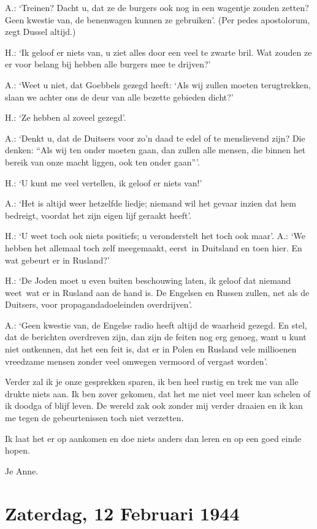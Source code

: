 \documentclass{book}
\begin{document}
A.: `Treinen? Dacht u, dat ze de burgers ook nog in een wagentje zouden
zetten? Geen kwestie van, de benenwagen kunnen ze gebruiken'. (Per pedes
apostolorum, zegt Dussel altijd.)

H.: `Ik geloof er niets van, u ziet alles door een veel te zwarte bril.
Wat zouden ze er voor belang bij hebben alle burgers mee te drijven?'

A.: `Weet u niet, dat Goebbels gezegd heeft: `Als wij zullen moeten
terugtrekken, slaan we achter ons de deur van alle bezette gebieden
dicht?'

H.: `Ze hebben al zoveel gezegd'.

A.: `Denkt u, dat de Duitsers voor zo'n daad te edel of te menslievend
zijn? Die denken: ``Als wij ten onder moeten gaan, dan zullen alle
mensen, die binnen het bereik van onze macht liggen, ook ten onder
gaan'''.

H.: `U kunt me veel vertellen, ik geloof er niets van!'

A.: `Het is altijd weer hetzelfde liedje; niemand wil het gevaar inzien
dat hem bedreigt, voordat het zijn eigen lijf geraakt heeft'.

H.: `U weet toch ook niets positiefs; u veronderstelt het toch ook
maar'. A.: `We hebben het allemaal toch zelf meegemaakt, eerst~in
Duitsland en toen hier. En wat gebeurt er in Rusland?'

H.: `De Joden moet u even buiten beschouwing laten, ik geloof dat
niemand weet~wat er in Rusland aan de hand is. De Engelsen en Russen
zullen, net als de Duitsers, voor propagandadoeleinden overdrijven'.

A.: `Geen kwestie van, de Engelse radio heeft altijd de waarheid gezegd.
En stel, dat de berichten overdreven zijn, dan zijn de feiten nog erg
genoeg, want u kunt niet ontkennen, dat het een feit is, dat er in Polen
en Rusland vele millioenen vreedzame mensen zonder veel omwegen vermoord
of vergast worden'.

Verder zal ik je onze gesprekken sparen, ik ben heel rustig en trek me
van alle drukte niets aan. Ik ben zover gekomen, dat het me niet veel
meer kan schelen of ik doodga of blijf leven. De wereld zak ook zonder
mij verder draaien en ik kan me tegen de gebeurtenissen toch niet
verzetten.

Ik laat het er op aankomen en doe niets anders dan leren en op een goed
einde hopen.

Je Anne.

\chapter{Zaterdag, 12 Februari 1944}
\end{document}
